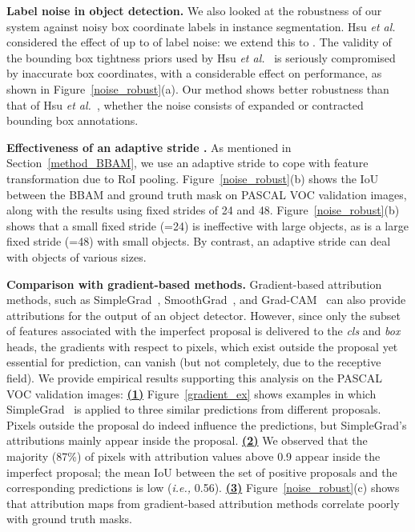\documentclass[final]{cvpr}
\begin{document}
\textbf{Label noise in object detection.} We also looked at the robustness of our system against noisy box coordinate labels in instance segmentation. 
Hsu \textit{et al.}~\cite{hsu2019weakly} considered the effect of up to  of label noise: we extend this to . 
The validity of the bounding box tightness priors used by Hsu \textit{et al.}~\cite{hsu2019weakly} is seriously compromised by inaccurate box coordinates, with a considerable effect on performance, as shown in Figure~\ref{noise_robust}(a).
Our method shows better robustness than that of Hsu \textit{et al.}~\cite{hsu2019weakly}, whether the noise consists of expanded or contracted bounding box annotations.

\textbf{Effectiveness of an adaptive stride .}
As mentioned in Section~\ref{method_BBAM}, we use an adaptive stride  to cope with feature transformation due to RoI pooling.
Figure~\ref{noise_robust}(b) shows the IoU between the BBAM and ground truth mask on PASCAL VOC validation images, along with the results using fixed strides of 24 and 48.
Figure~\ref{noise_robust}(b) shows that a small fixed stride (=24) is ineffective with large objects, as is a large fixed stride (=48) with small objects. By contrast, an adaptive stride  can deal with objects of various sizes.


\textbf{Comparison with gradient-based methods.}
Gradient-based attribution methods, such as SimpleGrad~\cite{zeiler2014visualizing}, SmoothGrad~\cite{smilkov2017smoothgrad}, and Grad-CAM~\cite{selvaraju2017grad} can also provide attributions for the output of an object detector. 
However, since only the subset of features associated with the imperfect proposal is delivered to the \textit{cls} and \textit{box} heads, the gradients with respect to pixels, which exist outside the proposal yet essential for prediction, can vanish (but not completely, due to the receptive field). 
We provide empirical results supporting this analysis on the PASCAL VOC validation images: \underline{\textbf{(1)}} Figure~\ref{gradient_ex} shows examples in which SimpleGrad~\cite{zeiler2014visualizing} is applied to three similar predictions from different proposals. Pixels outside the proposal do indeed influence the predictions, but SimpleGrad's attributions mainly appear inside the proposal. 
\underline{\textbf{(2)}} We observed that the majority (87\%) of pixels with attribution values above 0.9 appear inside the imperfect proposal; the mean IoU between the set of positive proposals and the corresponding predictions is low (\textit{i.e.,} 0.56).
\underline{\textbf{(3)}} Figure~\ref{noise_robust}(c) shows that attribution maps from gradient-based attribution methods correlate poorly with ground truth masks.
\end{document}
